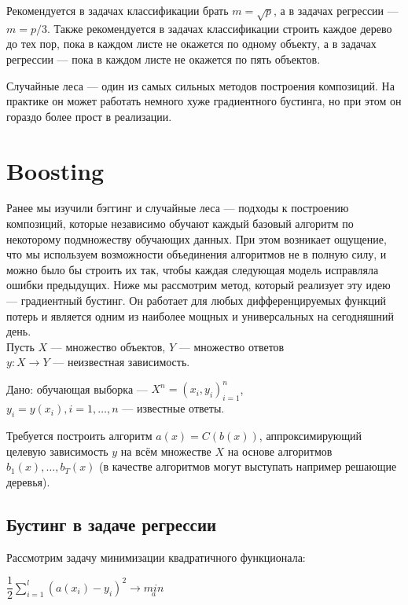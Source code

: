 \documentclass{article}
\theoremstyle{definition}
\theoremstyle{theorem}
\theoremstyle{remark}
\theoremstyle{theorem}
\theoremstyle{example}
\theoremstyle{theorem}
\theoremstyle{theorem}
\theoremstyle{theorem}
\theoremstyle{theorem}
\begin{document}
Рекомендуется в задачах классификации брать $m=\sqrt{p}$, а в задачах регрессии --- $m=p/3$. Также рекомендуется в задачах классификации строить каждое дерево до тех пор, пока в каждом листе не окажется по одному объекту, а в задачах регрессии — пока в каждом листе не окажется по пять объектов. 

Случайные леса --- один из самых сильных методов построения композиций. На практике он может работать немного хуже градиентного бустинга, но при этом он гораздо более прост в реализации.

\section{Boosting}

Ранее мы изучили бэггинг и случайные леса — подходы к построению композиций, которые независимо обучают каждый базовый алгоритм по некоторому подмножеству обучающих данных. При этом возникает ощущение, что мы используем
возможности объединения алгоритмов не в полную силу, и можно было бы строить их так, чтобы каждая следующая модель исправляла ошибки предыдущих. Ниже мы рассмотрим метод, который реализует эту идею — градиентный бустинг. Он работает для любых дифференцируемых функций потерь и является одним из наиболее мощных и универсальных на сегодняшний день.
\\

Пусть $X$ --- множество объектов, $Y$ --- множество ответов\\
$y: X \to Y$ --- неизвестная зависимость.

\vspace{0.2cm}
Дано: обучающая выборка --- $X^n = (x_i,y_i)_{i=1}^n $, \\
$y_i = y(x_i), i = 1,\ldots,n$ --- известные ответы.

\vspace{0.2cm}
Требуется построить алгоритм $a(x) = C(b(x))$, аппроксимирующий целевую зависимость $y$ на всём множестве $X$ на основе алгоритмов $b_1(x), \ldots , b_T (x)$ (в качестве алгоритмов могут выступать например решающие деревья).

\subsection{Бустинг в задаче регрессии}

Рассмотрим задачу минимизации квадратичного функционала:

$\dfrac{1}{2}\sum_{i=1}^{l}(a(x_i)-y_i)^2 \rightarrow \underset{a}{min}$
\end{document}
